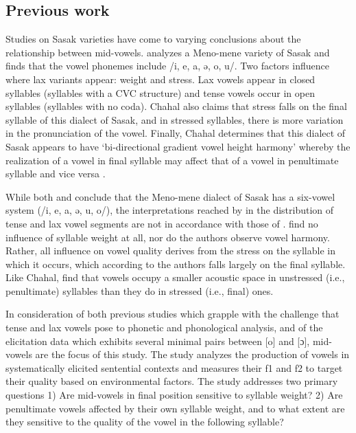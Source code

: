 \documentclass[12pt]{ouparticle}
\begin{document}
\subsection{Previous work}

Studies on Sasak varieties have come to varying conclusions about the relationship between mid-vowels. \citet[5]{chahal1998} analyzes a Meno-mene variety of Sasak and finds that the vowel phonemes include /i, e, a, ə, o, u/. Two factors influence where lax variants appear: weight and stress. Lax vowels appear in closed syllables (syllables with a CVC structure) and tense vowels occur in open syllables (syllables with no coda). Chahal also claims that stress falls on the final syllable of this dialect of Sasak, and in stressed syllables, there is more variation in the pronunciation of the vowel. Finally, Chahal determines that this dialect of Sasak appears to have `bi-directional gradient vowel height harmony' whereby the realization of a vowel in final syllable may affect that of a vowel in penultimate syllable and vice versa \citep[11-12]{chahal1998}.

While both \citet{archangeli2018} and \citet{chahal1998} conclude that the Meno-mene dialect of Sasak has a six-vowel system (/i, e, a, ə, u, o/), the interpretations reached by \citet{archangeli2018} in the distribution of tense and lax vowel segments are not in accordance with those of \citet{chahal1998}. \citeauthor{archangeli2018} find no influence of syllable weight at all, nor do the authors observe vowel harmony. Rather, all influence on vowel quality derives from the stress on the syllable in which it occurs, which according to the authors falls largely on the final syllable. Like Chahal, \citeauthor{archangeli2018} find that vowels occupy a smaller acoustic space in unstressed (i.e., penultimate) syllables than they do in stressed (i.e., final) ones. 

In consideration of both previous studies which grapple with the challenge that tense and lax vowels pose to phonetic and phonological analysis, and of the elicitation data which exhibits several minimal pairs between [o] and [ɔ], mid-vowels are the focus of this study. The study analyzes the production of vowels in systematically elicited sentential contexts and measures their f1 and f2 to target their quality based on environmental factors. The study addresses two primary questions 1) Are mid-vowels in final position sensitive to syllable weight? 2) Are penultimate vowels affected by their own syllable weight, and to what extent are they sensitive to the quality of the vowel in the following syllable? 
\end{document}
